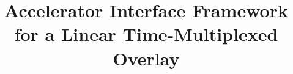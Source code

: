 \documentclass[conference]{IEEEtran}
\begin{document}
\title{Accelerator Interface Framework for a Linear Time-Multiplexed Overlay\\
}

\begin{comment}
\author{\IEEEauthorblockN{1\textsuperscript{st} Given Name Surname}
\IEEEauthorblockA{\textit{dept. name of organization (of Aff.)} \\
\textit{name of organization (of Aff.)}\\
City, Country \\
email address}
\and
\IEEEauthorblockN{2\textsuperscript{nd} Given Name Surname}
\IEEEauthorblockA{\textit{dept. name of organization (of Aff.)} \\
\textit{name of organization (of Aff.)}\\
City, Country \\
email address}
\and
\IEEEauthorblockN{3\textsuperscript{rd} Given Name Surname}
\IEEEauthorblockA{\textit{dept. name of organization (of Aff.)} \\
\textit{name of organization (of Aff.)}\\
City, Country \\
email address}
\and
\IEEEauthorblockN{4\textsuperscript{th} Given Name Surname}
\IEEEauthorblockA{\textit{dept. name of organization (of Aff.)} \\
\textit{name of organization (of Aff.)}\\
City, Country \\
email address}
\and
\IEEEauthorblockN{5\textsuperscript{th} Given Name Surname}
\IEEEauthorblockA{\textit{dept. name of organization (of Aff.)} \\
\textit{name of organization (of Aff.)}\\
City, Country \\
email address}
\and
\IEEEauthorblockN{6\textsuperscript{th} Given Name Surname}
\IEEEauthorblockA{\textit{dept. name of organization (of Aff.)} \\
\textit{name of organization (of Aff.)}\\
City, Country \\
email address}
}
\end{comment}

\maketitle
\end{document}
